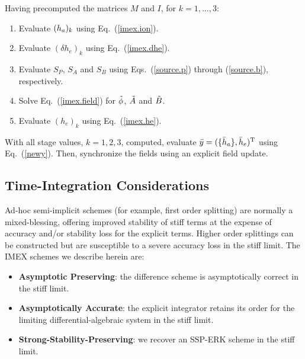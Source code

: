 Having precomputed the matrices $M$ and $I$, for $k=1,\ldots,3$:
%
\begin{enumerate}
\item
Evaluate $(h_a)_k$ using Eq.~(\ref{imex.ion}).
\item
Evaluate $(\delta h_e)_k$ using Eq.~(\ref{imex.dhe}).
\item
Evaluate $S_P$, $S_A$ and $S_B$ using Eqs.~(\ref{source.p}) through
(\ref{source.b}), respectively.
\item
Solve Eq.~(\ref{imex.field}) for $\tilde{\phi}$, $\tilde{A}$ and $\tilde{B}$.
\item
Evaluate $(h_e)_k$ using Eq.~(\ref{imex.he}). 
\end{enumerate}
%
With all stage values, $k=1,2,3$, computed, evaluate 
${\bar y} = ({\{\bar{h}_a\}},{\bar h_e})^{\rm T}$ using 
Eq.~(\ref{newy}).  Then, synchronize the fields using an explicit 
field update.

\subsection{Time-Integration Considerations}

Ad-hoc semi-implicit schemes (for example, first 
order splitting) are normally a mixed-blessing,
offering improved stability of stiff terms at the expense 
of accuracy and/or stability loss for the explicit terms.
Higher order splittings can be constructed but 
are susceptible to a severe accuracy loss in the stiff limit.
%
The IMEX schemes we describe herein \cite{pareschi:2000} are:
%
\begin{itemize}
\item {\bf Asymptotic Preserving}:  the difference scheme 
is asymptotically correct in the stiff limit. 
\item {\bf Asymptotically Accurate}: the explicit 
integrator retains its order for the limiting 
differential-algebraic system in the stiff limit.
\item {\bf Strong-Stability-Preserving}: we recover an 
SSP-ERK \cite{gottlieb:2001} scheme in the stiff limit.
\end{itemize}

